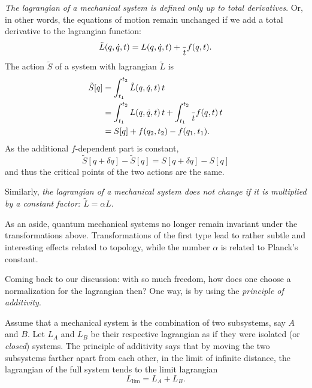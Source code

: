\documentclass[english,fontsize=11pt,paper=a5,oneside]{scrbook}
\let\d\relax
\DeclareMathOperator{\d}{d}
\theoremstyle{definition}
\newenvironment{remark}
  {\pushQED{\qed}\renewcommand{\qedsymbol}{$\lozenge$}\remarkx}
  {\popQED\endremarkx}
\begin{document}
\begin{remark}\label{rmk:manylagrangians}
    \emph{The lagrangian of a mechanical system is defined only up to total derivatives}.
    Or, in other words, the equations of motion remain unchanged if we add a total derivative to the lagrangian function:
    \begin{equation}
        \tilde L(q,\dot q, t) = L(q, \dot q, t) + \frac{\d}{\d t} f(q,t).
    \end{equation}
    The action $\tilde S$ of a system with lagrangian $\tilde L$ is
    \begin{align}
        \tilde S[q] &= \int_{t_1}^{t_2} \tilde L(q, \dot q, t) \,\d t \\
        &= \int_{t_1}^{t_2} L(q, \dot q, t) \,\d t + \int_{t_1}^{t_2} \frac{\d}{\d t} f(q,t) \,\d t \\
        &= S[q] + f(q_2, t_2) - f(q_1, t_1).
    \end{align}
    As the additional $f$-dependent part is constant,
    \begin{equation}
        \tilde S[q+\delta q] - \tilde S[q]
        = S[q+\delta q] - S[q]
    \end{equation}
    and thus the critical points of the two actions are the same.

    Similarly, \emph{the lagrangian of a mechanical system does not change if it is multiplied by a constant factor: $\tilde L = \alpha L$}.

    As an aside, quantum mechanical systems no longer remain invariant under the transformations above. Transformations of the first type lead to rather subtle and interesting effects related to topology, while the number $\alpha$ is related to Planck's constant. 
    \medskip

    Coming back to our discussion: with so much freedom, how does one choose a normalization for the lagrangian then?
    One way, is by using the \emph{principle of additivity}.
    \begin{tcolorbox}
        Assume that a mechanical system is the combination of two subsystems, say $A$ and $B$.
        Let $L_A$ and $L_B$ be their respective lagrangian as if they were isolated (or \emph{closed}) systems.
        The principle of additivity says that by moving the two subsystems farther apart from each other, in the limit of infinite distance, the lagrangian of the full system tends to the limit lagrangian
        \begin{equation}
            L_{\lim} = L_A + L_B.
        \end{equation}
    \end{tcolorbox}
\end{remark}
\end{document}
